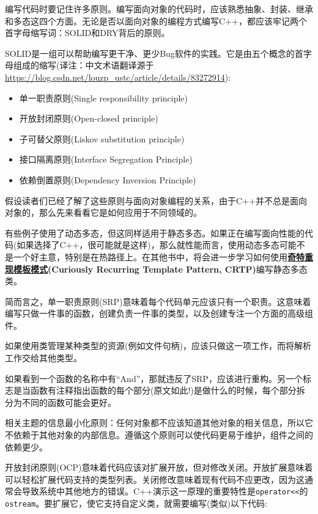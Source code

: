 
编写代码时要记住许多原则。编写面向对象的代码时，应该熟悉抽象、封装、继承和多态这四个方面。无论是否以面向对象的编程方式编写C++，都应该牢记两个首字母缩写词：SOLID和DRY背后的原则。

SOLID是一组可以帮助编写更干净、更少Bug软件的实践。它是由五个概念的首字母组成的缩写(译注：中文术语翻译源于 \url{https://blog.csdn.net/louzp_ustc/article/details/83272914}):

\begin{itemize}
\item 单一职责原则(Single responsibility principle)
\item 开放封闭原则(Open-closed principle)
\item 子可替父原则(Liskov substitution principle)
\item 接口隔离原则(Interface Segregation Principle)
\item 依赖倒置原则(Dependency Inversion Principle)
\end{itemize}

假设读者们已经了解了这些原则与面向对象编程的关系，由于C++并不总是面向对象的，那么先来看看它是如何应用于不同领域的。

有些例子使用了动态多态，但这同样适用于静态多态。如果正在编写面向性能的代码(如果选择了C++，很可能就是这样)，那么就性能而言，使用动态多态可能不是一个好主意，特别是在热路径上。在其他书中，将会进一步学习如何使用\textbf{\href{https://ctj12461.netlify.app/2019/179eb0e9.html}{奇特重现模板模式}(Curiously Recurring Template Pattern, CRTP)}编写静态多态类。



简而言之，单一职责原则(SRP)意味着每个代码单元应该只有一个职责。这意味着编写只做一件事的函数，创建负责一件事的类型，以及创建专注一个方面的高级组件。

如果使用类管理某种类型的资源(例如文件句柄)，应该只做这一项工作，而将解析工作交给其他类型。

如果看到一个函数的名称中有“And”，那就违反了SRP，应该进行重构。另一个标志是当函数有注释指出函数的每个部分(原文如此!)是做什么的时候，每个部分拆分为不同的函数可能会更好。

相关主题的信息最小化原则：任何对象都不应该知道其他对象的相关信息，所以它不依赖于其他对象的内部信息。遵循这个原则可以使代码更易于维护，组件之间的依赖更少。


开放封闭原则(OCP)意味着代码应该对扩展开放，但对修改关闭。开放扩展意味着可以轻松扩展代码支持的类型列表。关闭修改意味着现有代码不应更改，因为这通常会导致系统中其他地方的错误。C++演示这一原理的重要特性是\texttt{operator<<}的\texttt{ostream}。要扩展它，使它支持自定义类，就需要编写(类似)以下代码:

